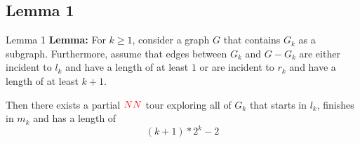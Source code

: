 \documentclass{beamer}
\begin{document}
\subsection{Lemma 1}
% 
% 
% 
\begin{frame}{Lemma 1}
% 
\textbf{Lemma: }For {\color{red}$k\geq1$}, consider a graph {\color{red}$G$} that contains {\color{red}$G_k$} as a subgraph. Furthermore, assume that edges between {\color{red}$G_k$} and {\color{red}$G-G_k$} are either incident to {\color{red}$l_k$} and have a length of at least {\color{red}$1$} or are incident to {\color{red}$r_k$} and have a length of at least {\color{red}$k+1$}. \linebreak

{\qquad Then there exists a partial ${\color{red}NN}$ tour exploring all of {\color{red}$G_k$} that starts in {\color{red}$l_k$}, finishes in {\color{red}$m_k$} and has a length of {\color{red}$$(k+1)*2^k-2$$}}
\end{frame}
% 
% 
% 
% 
\end{document}
